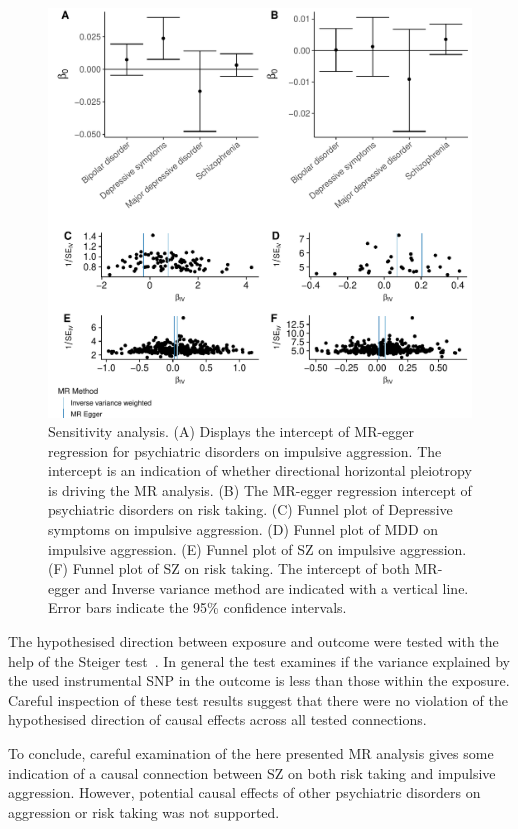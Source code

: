 \begin{figure}[htpb]
  \centering
  \includegraphics[width=0.9\linewidth]{figures/sensitvity_plot.pdf}
  \caption{Sensitivity analysis.
    (A) Displays the intercept of MR-egger regression for psychiatric disorders on impulsive aggression. The intercept is an indication of whether directional horizontal pleiotropy is driving the MR analysis.
    (B) The MR-egger regression intercept of psychiatric disorders on risk taking.
    (C) Funnel plot of Depressive symptoms on impulsive aggression. 
    (D) Funnel plot of MDD on impulsive aggression. 
    (E) Funnel plot of SZ on impulsive aggression. 
    (F) Funnel plot of SZ on risk taking. 
    The intercept of both MR-egger and Inverse variance method are indicated with a vertical line.
    Error bars indicate the 95\% confidence intervals.
  }\label{fig:sensitivity}
\end{figure}

The hypothesised direction between exposure and outcome were tested with the help of the Steiger test~\cite{Steiger1980}.
In general the test examines if the variance explained by the used instrumental SNP in the outcome is less than those within the exposure. 
Careful inspection of these test results suggest that there were no violation of the hypothesised direction of causal effects across all tested connections.

To conclude, careful examination of the here presented MR analysis gives some indication of a causal connection between SZ on both risk taking and impulsive aggression.
However, potential causal effects of other psychiatric disorders on aggression or risk taking was not supported.
